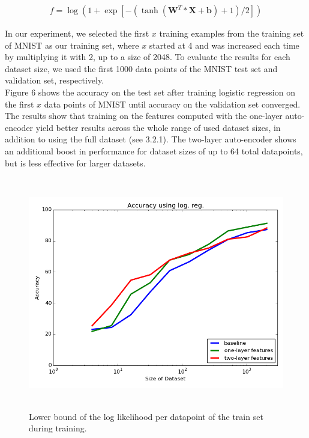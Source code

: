 \documentclass{article}
\begin{document}
\begin{align}
    f = \log(1 + \exp[-(\tanh(\textbf{W}^T*\textbf{X} + \textbf{b}) + 1)/2])
\end{align}


In our experiment, we selected the first $x$ training examples from the training set of MNIST as our training set, where $x$ started at 4 and was increased each time by multiplying it with 2, up to a size of 2048. To evaluate the results for each dataset size, we used the first 1000 data points of the MNIST test set and validation set, respectively.\\
Figure 6 shows the accuracy on the test set after training logistic regression on the first $x$ data points of MNIST until accuracy on the validation set converged. The results show that training on the features computed with the one-layer auto-encoder yield better results across the whole range of used dataset sizes, in addition to using the full dataset (see 3.2.1). The two-layer auto-encoder shows an additional boost in performance for dataset sizes of up to 64 total datapoints, but is less effective for larger datasets. \\

\begin{figure}[htb]
\begin{center}
\includegraphics[height=4in,width=5in]{logreg_smallsets_report.png}
\caption{Lower bound of the log likelihood per datapoint of the train set during training.}
\end{center}
\end{figure}
\end{document}
